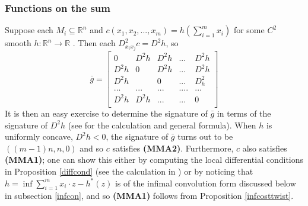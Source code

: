 \documentclass[letter,10pt]{article}
\theoremstyle{dotless}
\begin{document}



\subsubsection{Functions on the sum}
Suppose each $M_i \subseteq \mathbb{R}^n$ and $c(x_1,x_2,...,x_m) = h(\sum_{i=1}^m x_i)$ for some $C^2$ smooth $h: \mathbb{R}^n \rightarrow \mathbb{R}$ .   Then each $D^2_{x_ix_j}c =D^2h$, so 
\begin{equation*}\bar g=
 \begin{bmatrix}
0 & D^2h & D^2h&...& D^2h\\
D^2h & 0&D^2h&...&D^2h \\
D^2h  & & 0&...&D^2_h\\
...  & ...&...&....&... \\
D^2h  & D^2h  &...&...&0 \\
\end{bmatrix}
\end{equation*}
It is then an easy exercise to determine the signature of $\bar g$ in terms of the signature of $D^2h$ (see \cite{P}\cite{P4} for the calculation and general formula).  When  $h$ is uniformly concave, $D^2h<0$, the signature of $\bar g$ turns out to be $((m-1)n,n,0)$ and so $c$ satisfies \textbf{(MMA2)}.   Furthermore, $c$ also satisfies \textbf{(MMA1)}; one can show this either by computing the local differential conditions  in Proposition \ref{diffcond} (see the calculation in \cite{P4}) or by noticing that $h =\inf \sum_{i=1}^m x_i \cdot z -h^*(z)$ is of the infimal convolution form discussed below in subsection \ref{infcon}, and so \textbf{(MMA1)} follows from Proposition \ref{infcosttwist}.  

\end{document}
